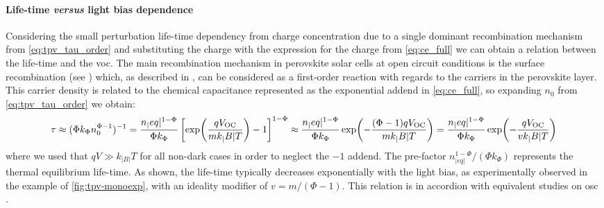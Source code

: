 	\paragraph{Life-time \textsl{versus} light bias dependence}\label{tpv_tau_vs_intensity}
	Considering the small perturbation life-time dependency from charge concentration due to a single dominant recombination mechanism from \cref{eq:tpv_tau_order} and substituting the charge with the expression for the charge from \cref{eq:ce_full} we can obtain a relation between the life-time and the \gls{voc}.
	The main recombination mechanism in perovskite solar cells at open circuit conditions is the surface recombination (see ) which, as described in , can be considered as a first-order reaction with regards to the carriers \label{tpv_chemical_charge}in the perovskite layer.
	This carrier density is related to the chemical capacitance represented as the exponential addend in \cref{eq:ce_full}, so expanding $n_0$ from \cref{eq:tpv_tau_order} we obtain:
	\begin{dmath}\label{eq:tpv_tau_vs_intensity}
		\tau \approx (\Phi k_\Phi n_0^{\Phi-1})^{-1} = \frac{n_|eq|^{1-\Phi}}{\Phi k_\Phi} \left[\exp(\frac{q\voc}{mk_|B|T}) - 1\right]^{1-\Phi} \approx \frac{n_|eq|^{1-\Phi}}{\Phi k_\Phi} \exp(-\frac{(\Phi-1)q\voc}{mk_|B|T}) = \frac{n_|eq|^{1-\Phi}}{\Phi k_\Phi} \exp(-\frac{q\voc}{vk_|B|T})
	\end{dmath}
	where we used that $qV \gg k_|B|T$ for all non-dark cases in order to neglect the $-1$ addend.
	The pre-factor $n_|eq|^{1-\Phi}/(\Phi k_\Phi)$ represents the thermal equilibrium life-time.
	As shown, the life-time typically decreases exponentially with the light bias, as experimentally observed in the example of \cref{fig:tpv-monoexp}, with an ideality modifier of $v = m/(\Phi-1)$.
	This relation is in accordion with equivalent studies on \gls{osc} \cite{Shuttle2008,Shuttle2008d,Credgington2011}.

